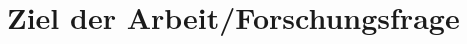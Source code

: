 \documentclass[../main.tex]{subfiles}
\begin{document}
\chapter{Ziel der Arbeit/Forschungsfrage}
\label{question}

\end{document}
